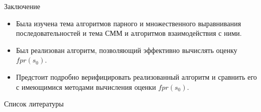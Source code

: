 \documentclass{beamer}
\begin{document}
	\begin{frame}{Заключение}
		\begin{itemize}
			\item Была изучена тема алгоритмов парного и множественного выравнивания последовательностей и тема СММ и алгоритмов взаимодействия с ними.
			\item Был реализован алгоритм, позволяющий эффективно вычислять оценку ${fpr}(s_{0})$.
			\item Предстоит подробно верифицировать реализованный алгоритм и сравнить его с имеющимися методами вычисления оценки ${fpr}(s_{0})$.
		\end{itemize}
	\end{frame}

	\begin{frame}{Список литературы}
		\nocite{Newberg2009}
		\nocite{Compeau2015}
		\nocite{Compeau2015a}
		\nocite{Dugad1996}		
		
		
	\end{frame}
\end{document}
